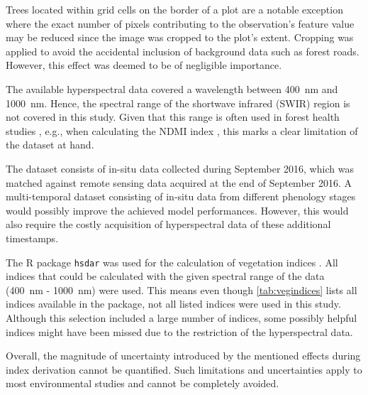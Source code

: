 \documentclass[remotesensing,article,submit,moreauthors,pdftex]{Definitions/mdpi}
\begin{document}
Trees located within grid cells on the border of a plot are a notable exception where the exact number of pixels contributing to the observation's feature value may be reduced since the image was cropped to the plot's extent.
Cropping was applied to avoid the accidental inclusion of background data such as forest roads.
However, this effect was deemed to be of negligible importance.

The available hyperspectral data covered a wavelength between 400~nm and 1000~nm.
Hence, the spectral range of the shortwave infrared (SWIR) region is not covered in this study.
Given that this range is often used in forest health studies \cite{hais2019}, e.g., when calculating the \ac{NDMI} index \cite{gao1996}, this marks a clear limitation of the dataset at hand.

The dataset consists of in-situ data collected during September 2016, which was matched against remote sensing data acquired at the end of September 2016.
A multi-temporal dataset consisting of in-situ data from different phenology stages would possibly improve the achieved model performances.
However, this would also require the costly acquisition of hyperspectral data of these additional timestamps.

The R package \texttt{hsdar} was used for the calculation of vegetation indices \cite{lehnert2016}.
All indices that could be calculated with the given spectral range of the data (400~nm - 1000~nm) were used.
This means even though \autoref{tab:vegindices} lists all indices available in the package, not all listed indices were used in this study.
Although this selection included a large number of indices, some possibly helpful indices might have been missed due to the restriction of the hyperspectral data.

Overall, the magnitude of uncertainty introduced by the mentioned effects during index derivation cannot be quantified.
Such limitations and uncertainties apply to most environmental studies and cannot be completely avoided.
\end{document}
